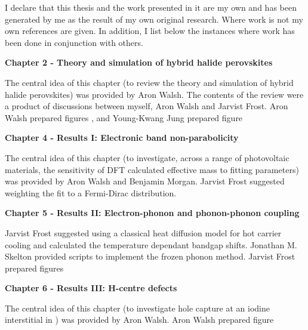 I declare that this thesis and the work presented in it are my own and has been generated by me as the result of my own original research. Where work is not my own references are given. In addition, I list below the instances where work has been done in conjunction with others.
\vspace{\frontmatterbaselineskip}

\textbf{Chapter 2 - Theory and simulation of hybrid halide perovskites } 

The central idea of this chapter (to review the theory and simulation of hybrid halide perovskites) was provided by Aron Walsh. The contents of the review were a product of discussions between myself, Aron Walsh and Jarvist Frost. Aron Walsh prepared figures , and Young-Kwang Jung prepared figure

\vspace{\frontmatterbaselineskip}

\textbf{Chapter 4  - Results I: Electronic band non-parabolicity}

The central idea of this chapter (to investigate, across a range of photovoltaic materials, the sensitivity of DFT calculated effective mass to fitting parameters) was provided by Aron Walsh and Benjamin Morgan. Jarvist Frost suggested weighting the fit to a Fermi-Dirac distribution. 

\vspace{\frontmatterbaselineskip}

\textbf{Chapter 5  - Results II: Electron-phonon and phonon-phonon coupling}

Jarvist Frost suggested using a classical heat diffusion model for hot carrier cooling and calculated the temperature dependant bandgap shifts. Jonathan M. Skelton provided scripts to implement the frozen phonon method. Jarvist Frost prepared figures 

\vspace{\frontmatterbaselineskip}

\textbf{Chapter 6  - Results III: H-centre defects}

The central idea of this chapter (to investigate hole capture at an iodine interstitial in ) was provided by Aron Walsh. Aron Walsh prepared figure